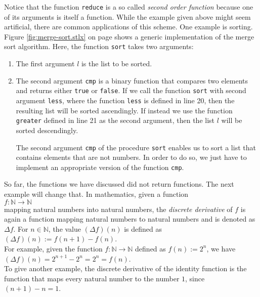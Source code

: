 Notice that the function \texttt{reduce} is a so called \emph{second order function} because
one of its arguments is itself a function.  While the example given above might seem
artificial, there are common applications of this scheme.  One example is sorting.
Figure \ref{fig:merge-sort.stlx} on page \pageref{fig:merge-sort.stlx} shows a generic
implementation of the merge sort algorithm.  Here, the function \texttt{sort} takes two
arguments:
\begin{enumerate}
\item The first argument $l$ is the list to be sorted.
\item The second argument \texttt{cmp} is a binary function that compares two  elements
      and returns either \texttt{true} or \texttt{false}.  If we call the function
      \texttt{sort} with second argument \texttt{less}, where the function \texttt{less} is
      defined in line 20, then the resulting list will be sorted ascendingly.
      If instead we use the function \texttt{greater} defined in line 21 as the second
      argument, then the list $l$ will be sorted descendingly.

      The second argument \texttt{cmp} of the procedure \texttt{sort} enables us to sort a list that
      contains elements that are not numbers.  In order to do so, we just have to implement an
      appropriate version of the function \texttt{cmp}.
\end{enumerate}
So far, the functions we have discussed did not return functions.  The next example will change
that.  In mathematics, given a function
\\[0.2cm]
\hspace*{1.3cm}
$f: \mathbb{N} \rightarrow \mathbb{N}$
\\[0.2cm]
mapping natural numbers into natural numbers, the \emph{discrete derivative} of $f$ is again a
function mapping natural numbers to natural numbers and is denoted
as $\Delta f$.  For $n \in \mathbb{N}$, the value $(\Delta f)(n)$ is defined as
\\[0.2cm]
\hspace*{1.3cm}
$(\Delta f)(n) := f(n+1) - f(n)$.
\\[0.2cm]
For example, given the function $f: \mathbb{N} \rightarrow \mathbb{N}$ defined as $f(n) := 2^n$,
we have
\\[0.2cm]
\hspace*{1.3cm}
$(\Delta f)(n) = 2^{n+1} - 2^n = 2^n = f(n)$.
\\[0.2cm]
To give another example, the discrete derivative of the identity function is the function that
maps every natural number to the number $1$, since $(n+1) - n = 1$.  

